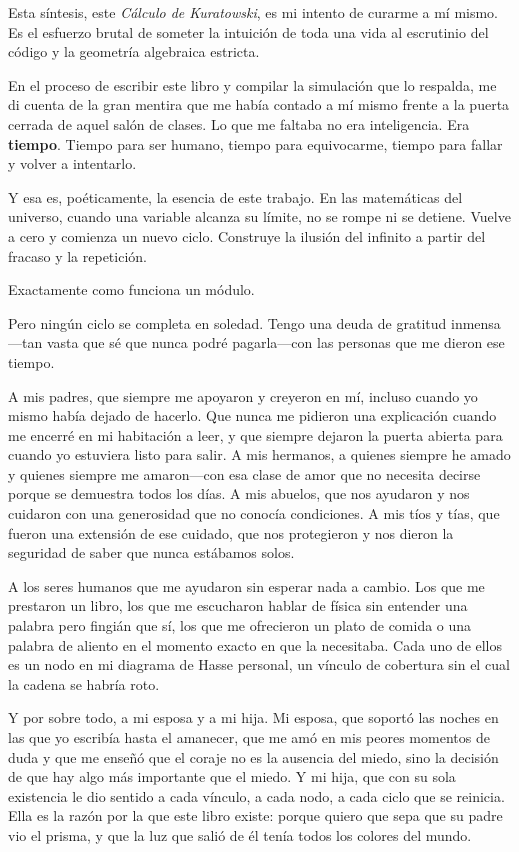 \documentclass[11pt, a4paper, openany]{book}
\begin{document}
Esta s\'intesis, este \textit{C\'alculo de Kuratowski}, es mi intento de
curarme a m\'i mismo. Es el esfuerzo brutal de someter la intuici\'on de
toda una vida al escrutinio del c\'odigo y la geometr\'ia algebraica
estricta.

En el proceso de escribir este libro y compilar la simulaci\'on que lo
respalda, me di cuenta de la gran mentira que me hab\'ia contado a m\'i
mismo frente a la puerta cerrada de aquel sal\'on de clases. Lo que me
faltaba no era inteligencia. Era \textbf{tiempo}. Tiempo para ser
humano, tiempo para equivocarme, tiempo para fallar y volver a
intentarlo.

Y esa es, po\'eticamente, la esencia de este trabajo. En las
matem\'aticas del universo, cuando una variable alcanza su l\'imite, no
se rompe ni se detiene. Vuelve a cero y comienza un nuevo ciclo.
Construye la ilusi\'on del infinito a partir del fracaso y la
repetici\'on.

Exactamente como funciona un m\'odulo.

\bigskip

Pero ning\'un ciclo se completa en soledad. Tengo una deuda de gratitud
inmensa---tan vasta que s\'e que nunca podr\'e pagarla---con las personas
que me dieron ese tiempo.

A mis padres, que siempre me apoyaron y creyeron en m\'i, incluso
cuando yo mismo hab\'ia dejado de hacerlo. Que nunca me pidieron una
explicaci\'on cuando me encerr\'e en mi habitaci\'on a leer, y que
siempre dejaron la puerta abierta para cuando yo estuviera listo para
salir. A mis hermanos, a quienes siempre he amado y quienes siempre me
amaron---con esa clase de amor que no necesita decirse porque se
demuestra todos los d\'ias. A mis abuelos, que nos ayudaron y nos
cuidaron con una generosidad que no conoc\'ia condiciones. A mis t\'ios y
t\'ias, que fueron una extensi\'on de ese cuidado, que nos protegieron y
nos dieron la seguridad de saber que nunca est\'abamos solos.

A los seres humanos que me ayudaron sin esperar nada a cambio. Los que
me prestaron un libro, los que me escucharon hablar de f\'isica sin
entender una palabra pero fingi\'an que s\'i, los que me ofrecieron un
plato de comida o una palabra de aliento en el momento exacto en que la
necesitaba. Cada uno de ellos es un nodo en mi diagrama de Hasse
personal, un v\'inculo de cobertura sin el cual la cadena se habr\'ia
roto.

Y por sobre todo, a mi esposa y a mi hija. Mi esposa, que soport\'o las
noches en las que yo escrib\'ia hasta el amanecer, que me am\'o en mis
peores momentos de duda y que me ense\~n\'o que el coraje no es la
ausencia del miedo, sino la decisi\'on de que hay algo m\'as importante
que el miedo. Y mi hija, que con su sola existencia le dio sentido a
cada v\'inculo, a cada nodo, a cada ciclo que se reinicia. Ella es la
raz\'on por la que este libro existe: porque quiero que sepa que su
padre vio el prisma, y que la luz que sali\'o de \'el ten\'ia todos los
colores del mundo.
\end{document}
